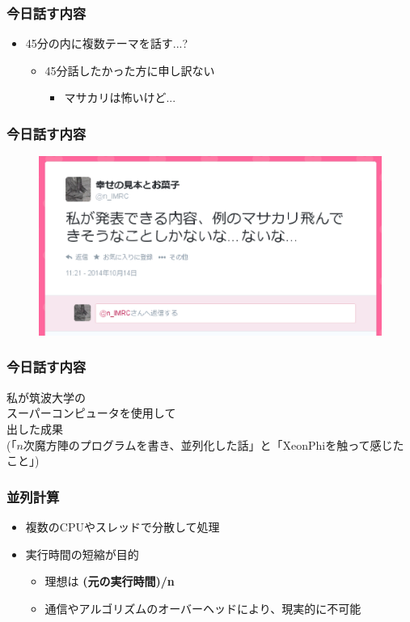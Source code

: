 \documentclass[dvipdfmx,20pt,notheorems,t]{beamer}
\begin{document}
\begin{frame}\frametitle{今日話す内容}
\begin{itemize}
\item 45分の内に複数テーマを話す...?
\begin{itemize}
\item 45分話したかった方に申し訳ない
\begin{itemize}
\item マサカリは怖いけど...
\end{itemize}
\end{itemize}
\end{itemize}
\end{frame}
\begin{frame}\frametitle{今日話す内容}
\begin{figure}[htb]
\centering
\includegraphics[width=\textwidth]{2.eps}
\end{figure}
\end{frame}
\begin{frame}\frametitle{今日話す内容}
\centering
\vspace*{\fill}
私が筑波大学の \\
スーパーコンピュータを使用して \\
出した成果 \\
(「$n$次魔方陣のプログラムを書き、並列化した話」と「XeonPhiを触って感じたこと」)
\vspace*{\fill}
\end{frame}

\begin{frame}\frametitle{並列計算}
\begin{itemize}
\item 複数のCPUやスレッドで分散して処理
\item 実行時間の短縮が目的
\begin{itemize}
\item 理想は \textbf{(元の実行時間)/n}
\item 通信やアルゴリズムのオーバーヘッドにより、現実的に不可能
\end{itemize}
\end{itemize}
\end{frame}
\end{document}
